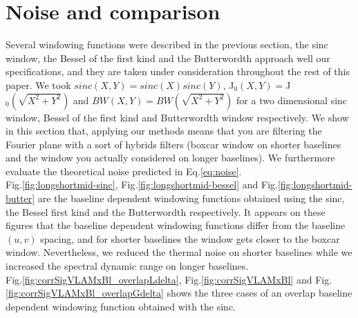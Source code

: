 \documentclass[useAMS,usenatbib]{mn2e}
\begin{document}
\section{Noise and comparison}
Several windowing functions  were described in the previous section, the sinc window, the Bessel of the first kind and the 
Butterwordth approach well our specifications, and they are taken under consideration throughout the rest of this paper. We took  
$sinc(X,Y)=sinc(X)sinc(Y)$, J$_0(X,Y)=$J$_0(\sqrt{X^2 + Y^2})$ and $BW(X,Y)=BW(\sqrt{X^2 + Y^2})$ for a two dimensional 
sinc window, Bessel of the first kind and Butterwordth window respectively. We show in this 
section that, applying our methods means that you are filtering the Fourier plane with a sort of hybrids filters (boxcar window on 
shorter baselines and the window you actually considered on longer baselines). We furthermore evaluate the theoretical noise predicted in 
Eq.\ref{eq:noise}.\\
Fig.\ref{fig:longshortmid-sinc}, Fig.\ref{fig:longshortmid-bessel} and Fig.\ref{fig:longshortmid-butter} are the baseline dependent 
windowing functions obtained using the sinc, the Bessel first kind and the Butterwordth respectively.  It appears on these figures that the 
baseline dependent windowing functions differ from the baseline $(u,v)$ spacing, and for shorter baselines the window gets closer to the 
boxcar window. Nevertheless, we reduced the thermal noise on shorter baselines while we increased the spectral dynamic range 
on longer baselines. \\
Fig.\ref{fig:corrSigVLAMxBl_overlapLdelta}, Fig.\ref{fig:corrSigVLAMxBl} and Fig.\ref{fig:corrSigVLAMxBl_overlapGdelta} shows the three 
cases of an overlap baseline dependent windowing function obtained with the sinc.
\end{document}
